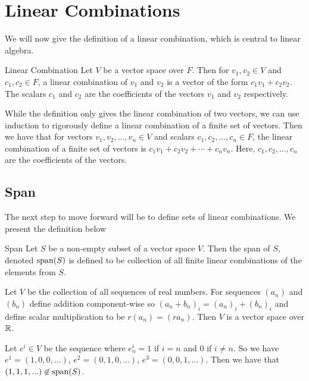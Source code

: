 \documentclass[main.tex]{subfiles}
\begin{document}
    \section{Linear Combinations}
    We will now give the definition of a linear combination, which is central to linear algebra. 
    \begin{defn}{Linear Combination}{}
        Let $V$ be a vector space over $F$. Then for $v_1, v_2\in V$ and $c_1, c_2\in F$, a linear combination of $v_1$ and $v_2$ is a vector of the form $c_1v_1 + c_2v_2$. The scalars $c_1$ and $c_2$ are the coefficients of the vectors $v_1$ and $v_2$ respectively.
    \end{defn}
    While the definition only gives the linear combination of two vectors, we can use induction to rigorously define a linear combination of a finite set of vectors. Then we have that for vectors $v_1, v_2, ..., v_n\in V$ and scalars $c_1, c_2, ..., c_n \in F$, the linear combination of a finite set of vectors is $c_1v_1 + c_2v_2 + \cdots + c_nv_n$. Here, $c_1, c_2, ..., c_n$ are the coefficients of the vectors. 

    \subsection{Span}
    The next step to move forward will be to define sets of linear combinations. We present the definition below 
    \begin{defn}{Span}{}
        Let $S$ be a non-empty subset of a vector space $V$. Then the span of $S$, denoted $\operatorname{span}(S)$ is defined to be collection of all finite linear combinations of the elements from $S$.
    \end{defn}

    \begin{example}
        Let $V$ be the collection of all sequences of real numbers. For sequences $(a_n)$ and $(b_n)$ define addition component-wise so $(a_n+b_n)_i = (a_n)_i + (b_n)_i$ and define scalar multiplication to be $r(a_n) = (ra_n)$. Then $V$ is a vector space over $\mathbb{R}$. \bigbreak 

        Let $e^i \in V$ be the sequence where $e^i_n = 1$ if $i = n$ and 0 if $i \neq n$. So we have $e^1 = (1, 0, 0, ...)$, $e^2 = (0, 1, 0, ...)$, $e^3 = (0, 0, 1, ...)$. Then we have that $(1, 1, 1, ...) \not\in \operatorname{span}(S)$. 
    \end{example}
\end{document}
